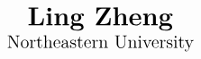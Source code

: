 \begin{frame}

  \begin{center}
    \Huge{\color{beamer@blendedblue}{Soft Contract Verification for Higher-order Languages}}
  \end{center}

  \vspace{0.5em}

  \[
  \Large
  \begin{array}{@{}cc@{}}
    \huge
    \text{\textbf{Ling Zheng}}\\
    \Large
    \text{Northeastern University}
  \end{array}
  \]

\end{frame}
